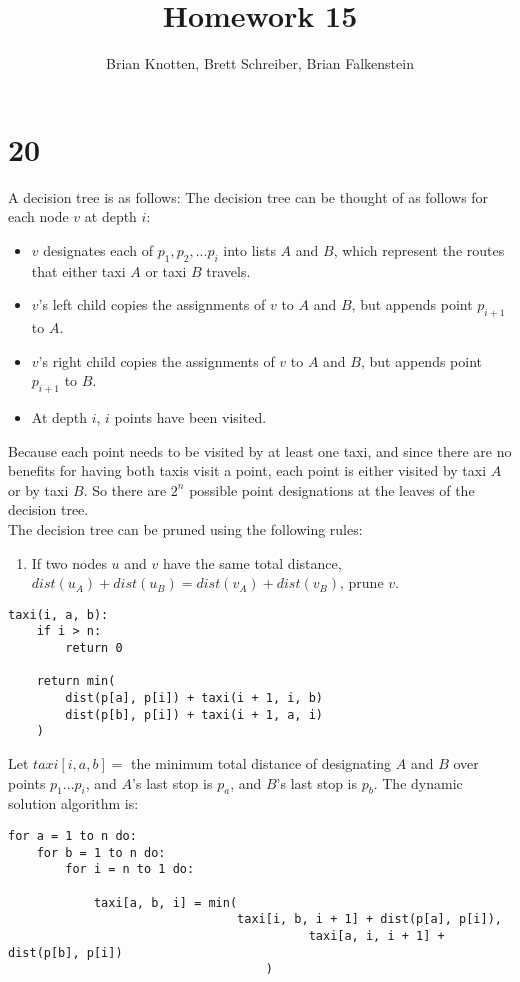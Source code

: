 \documentclass[letterpaper,notitlepage,twoside]{article}
\begin{document}
\title{Homework 15}
\author{Brian Knotten, Brett Schreiber, Brian Falkenstein}
\maketitle

\section*{20}
A decision tree is as follows:
The decision tree can be thought of as follows for each node $v$ at depth $i$:
\begin{itemize}
  \item $v$ designates each of $p_1,p_2,...p_i$ into lists $A$ and $B$, which represent the routes that either taxi $A$ or taxi $B$ travels.
  \item $v$'s left child copies the assignments of $v$ to $A$ and $B$, but appends point $p_{i + 1}$ to $A$.
  \item $v$'s right child copies the assignments of $v$ to $A$ and $B$, but appends point $p_{i + 1}$ to $B$.
  \item At depth $i$, $i$ points have been visited.
\end{itemize}
Because each point needs to be visited by at least one taxi, and since there are no benefits for having both taxis visit a point, each point is either visited by taxi $A$ or by taxi $B$. So there are $2^n$ possible point designations at the leaves of the decision tree. \\
The decision tree can be pruned using the following rules:
\begin{enumerate}
  \item If two nodes $u$ and $v$ have the same total distance, $dist(u_A) + dist(u_B) = dist(v_A) + dist(v_B)$, prune $v$.
  
\end{enumerate}

\begin{verbatim}
taxi(i, a, b):
    if i > n:
        return 0
    
    return min(
        dist(p[a], p[i]) + taxi(i + 1, i, b)
        dist(p[b], p[i]) + taxi(i + 1, a, i)
    )
\end{verbatim}

Let $taxi[i, a, b] =$ the minimum total distance of designating $A$ and $B$ over points $p_1...p_i$, and $A$'s last stop is $p_a$, and $B$'s last stop is $p_b$. The dynamic solution algorithm is:

\begin{verbatim}
for a = 1 to n do:
    for b = 1 to n do:
        for i = n to 1 do:
        
            taxi[a, b, i] = min(
                                taxi[i, b, i + 1] + dist(p[a], p[i]),
					                      taxi[a, i, i + 1] + dist(p[b], p[i])
				                    )
\end{verbatim}
\end{document}
